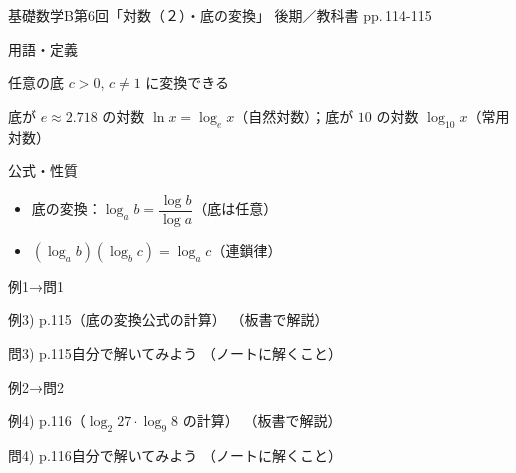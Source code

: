 \documentclass[aspectratio=43,professionalfonts,handout]{beamer}
\newcommand{\LectureNum}{6}
\newcommand{\LectureTitle}{対数（２）・底の変換}
\newcommand{\TextPages}{pp.\,114-115}
\newcommand{\CourseName}{基礎数学B}
\renewcommand{\TermName}{後期}
\begin{document}
\begin{frame}{\CourseName\quad 第\LectureNum 回「\LectureTitle 」}
  {\small \TermName\quad \TeacherName\quad ／\quad 教科書 \TextPages}

  \begin{block}{用語・定義}
  \begin{description}[labelwidth=5.5em]
    \item[\kw{底の変換公式：$\log_a b = \dfrac{\log_c b}{\log_c a}$}] 任意の底 $c > 0$, $c \neq 1$ に変換できる
    \item[\kw{自然対数・常用対数（参考）}] 底が $e \approx 2.718$ の対数 $\ln x = \log_e x$（自然対数）；底が $10$ の対数 $\log_{10} x$（常用対数）
  \end{description}
  \end{block}
\end{frame}

\begin{frame}{公式・性質}
  \begin{block}{}
  \begin{itemize}
    \item 底の変換：$\log_a b = \dfrac{\log b}{\log a}$（底は任意）
    \item $(\log_a b)(\log_b c) = \log_a c$（連鎖律）
  \end{itemize}
  \end{block}
\end{frame}

\begin{frame}{例1→問1}
  \begin{exampleblock}{例3) p.115（底の変換公式の計算）}
    （板書で解説）
  \end{exampleblock}

  \vfill

  \begin{block}{問3) p.115\quad 自分で解いてみよう}
    （ノートに解くこと）
  \end{block}
\end{frame}

\begin{frame}{例2→問2}
  \begin{exampleblock}{例4) p.116（$\log_2 27 \cdot \log_9 8$ の計算）}
    （板書で解説）
  \end{exampleblock}

  \vfill

  \begin{block}{問4) p.116\quad 自分で解いてみよう}
    （ノートに解くこと）
  \end{block}
\end{frame}
\end{document}
